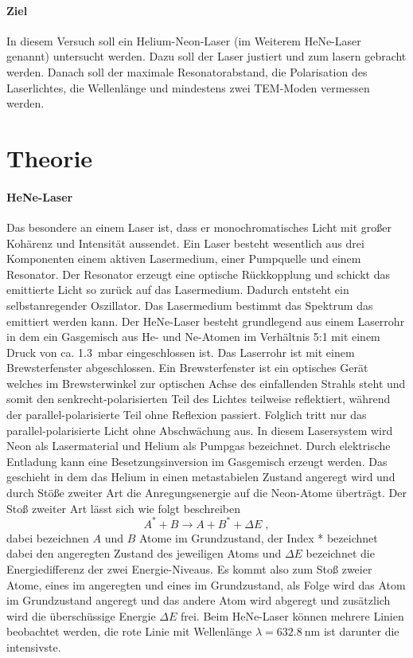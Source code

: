 \paragraph{Ziel} In diesem Versuch soll ein Helium-Neon-Laser (im Weiterem HeNe-Laser genannt) untersucht 
werden. Dazu soll der Laser justiert und zum lasern gebracht werden. Danach soll der maximale Resonatorabstand, 
die Polarisation des Laserlichtes, die Wellenlänge und mindestens zwei TEM-Moden vermessen werden. 

\section{Theorie}
\label{sec:Theorie}

\paragraph{HeNe-Laser} 
Das besondere an einem Laser ist, dass er monochromatisches Licht mit großer Kohärenz und Intensität aussendet. 
Ein Laser besteht wesentlich aus drei Komponenten einem aktiven Lasermedium, einer Pumpquelle und einem 
Resonator. Der Resonator erzeugt eine optische Rückkopplung und schickt das emittierte Licht so 
zurück auf das Lasermedium. Dadurch entsteht ein selbstanregender Oszillator. Das Lasermedium bestimmt 
das Spektrum das emittiert werden kann. 
\newline
Der HeNe-Laser besteht grundlegend aus einem Laserrohr in dem ein Gasgemisch aus He- und Ne-Atomen im 
Verhältnis 5:1 mit einem Druck von ca. \SI{1.3}{\milli\bar} eingeschlossen ist. Das Laserrohr 
ist mit einem Brewsterfenster abgeschlossen. Ein Brewsterfenster ist ein optisches Gerät welches 
im Brewsterwinkel zur optischen Achse des einfallenden Strahls steht und somit den senkrecht-polarisierten 
Teil des Lichtes teilweise reflektiert, während der parallel-polarisierte Teil ohne Reflexion passiert. 
Folglich tritt nur das parallel-polarisierte Licht ohne Abschwächung aus. In diesem Lasersystem wird 
Neon als Lasermaterial und Helium als Pumpgas bezeichnet. 
Durch elektrische Entladung kann eine Besetzungsinversion im Gasgemisch erzeugt werden. 
Das geschieht in dem das Helium in einen metastabielen Zustand angeregt wird und durch Stöße zweiter Art 
die Anregungsenergie auf die Neon-Atome überträgt. Der Stoß zweiter Art lässt sich wie folgt beschreiben 
\begin{equation*}
A^* + B \rightarrow A + B^* + \Delta E	\; ,
\end{equation*}
dabei bezeichnen $A$ und $B$ Atome im Grundzustand, der Index * bezeichnet dabei den angeregten Zustand des 
jeweiligen Atoms und $\Delta E$ bezeichnet die Energiedifferenz der zwei Energie-Niveaus. Es kommt also 
zum Stoß zweier Atome, eines im angeregten und eines im Grundzustand, als Folge wird das Atom im Grundzustand 
angeregt und das andere Atom wird abgeregt und zusätzlich wird die überschüssige Energie $\Delta E$ frei.
Beim HeNe-Laser können mehrere Linien beobachtet werden, die rote Linie mit Wellenlänge 
$\lambda = \SI{632.8}{\nano\meter}$ ist darunter die intensivste. 

